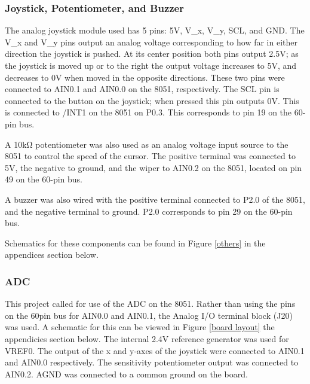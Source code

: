 \documentclass[12pt]{article}
\begin{document}
\subsubsection{Joystick, Potentiometer, and Buzzer}
The analog joystick module used has 5 pins: 5\si{V}, V\_x, V\_y, SCL, and GND. The V\_x and V\_y pins output an analog voltage corresponding to how far in either direction the joystick is pushed. At its center position both pins output 2.5\si{V}; as the joystick is moved up or to the right the output voltage increases to 5V, and decreases to 0V when moved in the opposite directions. These two pins were connected to AIN0.1 and AIN0.0 on the 8051, respectively. The SCL pin is connected to the button on the joystick; when pressed this pin outputs 0\si{V}. This is connected to /INT1 on the 8051 on P0.3. This corresponds to pin 19 on the 60-pin bus. 

A 10k\si{\ohm} potentiometer was also used as an analog voltage input source to the 8051 to control the speed of the cursor. The positive terminal was connected to 5\si{V}, the negative to ground, and the wiper to AIN0.2 on the 8051, located on pin 49 on the 60-pin bus. 

A buzzer was also wired with the positive terminal connected to P2.0 of the 8051, and the negative terminal to ground. P2.0 corresponds to pin 29 on the 60-pin bus. 

Schematics for these components can be found in Figure \ref{others} in the appendices section below. 

\subsubsection{ADC}
This project called for use of the ADC on the 8051. Rather than using the pins on the 60pin bus for AIN0.0 and AIN0.1, the Analog I/O terminal block (J20) was used. A schematic for this can be viewed in Figure \ref{board layout} the appendicies section below. The internal 2.4\si{V} reference generator was used for VREF0. The output of the x and y-axes of the joystick were connected to AIN0.1 and AIN0.0 respectively. The sensitivity potentiometer output was connected to AIN0.2. AGND was connected to a common ground on the board. 
\end{document}
